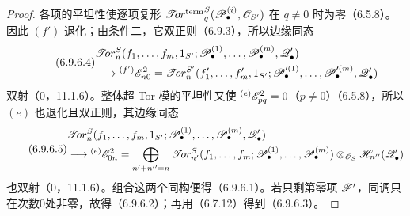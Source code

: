 \begin{proof}
各项的平坦性使逐项复形 $\mathop{\mathscr{T}\!or^{\mathrm{term}}}\nolimits^S_q(\mathscr P^{(i)}_\bullet,\mathscr O_{S'})$ 在 $q\ne0$ 时为零（6.5.8）。因此 $(f')$ 退化；由条件二，它双正则（6.9.3），所以边缘同态
\begin{equation}\tag{6.9.6.4}
\begin{aligned}
 &\mathscr{T}\!or_n^S(f_1,\ldots,f_m,1_{S'};
     \mathscr P^{(1)}_\bullet,\ldots,\mathscr P^{(m)}_\bullet,\mathscr Q'_\bullet)\\
 &\longrightarrow{}^{(f')}\mathscr E^2_{n0}
 =\mathscr{T}\!or_n^{S'}(f'_1,\ldots,f'_m,1_{S'};
     \mathscr P'^{(1)}_\bullet,\ldots,\mathscr P'^{(m)}_\bullet,\mathscr Q'_\bullet)
\end{aligned}
\end{equation}
双射（0，11.1.6）。整体超 Tor 模的平坦性又使 ${}^{(e)}\mathscr E^2_{pq}=0$（$p\ne0$）（6.5.8），所以 $(e)$ 也退化且双正则，其边缘同态
\begin{equation}\tag{6.9.6.5}
\begin{aligned}
 &\mathscr{T}\!or_n^S(f_1,\ldots,f_m,1_{S'};
     \mathscr P^{(1)}_\bullet,\ldots,\mathscr P^{(m)}_\bullet,\mathscr Q'_\bullet)\\
 &\longrightarrow{}^{(e)}\mathscr E^2_{0n}
 =\bigoplus_{n'+n''=n}\mathscr{T}\!or_{n'}^S(f_1,\ldots,f_m;
     \mathscr P^{(1)}_\bullet,\ldots,\mathscr P^{(m)}_\bullet)
       \otimes_{\mathscr O_S}\mathscr H_{n''}(\mathscr Q'_\bullet)
\end{aligned}
\end{equation}
也双射（0，11.1.6）。组合这两个同构便得（6.9.6.1）。若只剩第零项 $\mathscr F'$，同调只在次数0处非零，故得（6.9.6.2）；再用（6.7.12）得到（6.9.6.3）。
\end{proof}

